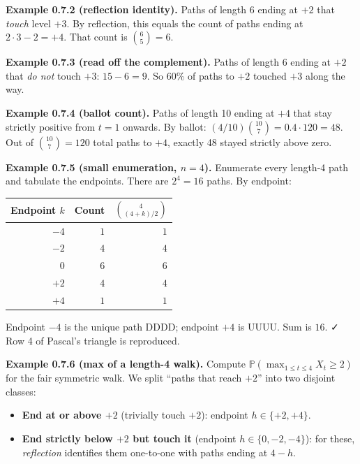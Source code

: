 \documentclass[
  10pt,
  twoside]{book}
\newcounter{none} %
\providecommand{\tightlist}{%
  \setlength{\itemsep}{0pt}\setlength{\parskip}{0pt}}
\begin{document}
\textbf{Example 0.7.2 (reflection identity).} Paths of length 6 ending
at \(+2\) that \emph{touch} level \(+3\). By reflection, this equals the
count of paths ending at \(2 \cdot 3 - 2 = +4\). That count is
\(\binom{6}{5} = 6\).

\textbf{Example 0.7.3 (read off the complement).} Paths of length 6
ending at \(+2\) that \emph{do not} touch \(+3\): \(15 - 6 = 9\). So
60\% of paths to \(+2\) touched \(+3\) along the way.

\textbf{Example 0.7.4 (ballot count).} Paths of length 10 ending at
\(+4\) that stay strictly positive from \(t = 1\) onwards. By ballot:
\((4/10) \binom{10}{7} = 0.4 \cdot 120 = 48\). Out of
\(\binom{10}{7} = 120\) total paths to \(+4\), exactly 48 stayed
strictly above zero.

\textbf{Example 0.7.5 (small enumeration, \(n = 4\)).} Enumerate every
length-4 path and tabulate the endpoints. There are \(2^4 = 16\) paths.
By endpoint:

{\def\LTcaptype{none} %
\begin{table}[H]
\centering
\begin{tabular}{|r|r|r|}
\toprule
Endpoint \(k\) & Count & \(\binom{4}{(4+k)/2}\) \\
\midrule



\(-4\) & \(1\) & \(1\) \\
\(-2\) & \(4\) & \(4\) \\
\(0\) & \(6\) & \(6\) \\
\(+2\) & \(4\) & \(4\) \\
\(+4\) & \(1\) & \(1\) \\
\bottomrule
\end{tabular}
\end{table}
}

Endpoint \(-4\) is the unique path DDDD; endpoint \(+4\) is UUUU. Sum is
\(16\). ✓ Row 4 of Pascal's triangle is reproduced.

\textbf{Example 0.7.6 (max of a length-4 walk).} Compute
\(\mathbb{P}\!\left(\max_{1 \le t \le 4} X_t \geq 2\right)\) for the
fair symmetric walk. We split ``paths that reach \(+2\)'' into two
disjoint classes:

\begin{itemize}
\tightlist
\item
  \textbf{End at or above \(+2\)} (trivially touch \(+2\)): endpoint
  \(h \in \{+2, +4\}\).
\item
  \textbf{End strictly below \(+2\) but touch it} (endpoint
  \(h \in \{0, -2, -4\}\)): for these, \emph{reflection} identifies them
  one-to-one with paths ending at \(4 - h\).
\end{itemize}
\end{document}
